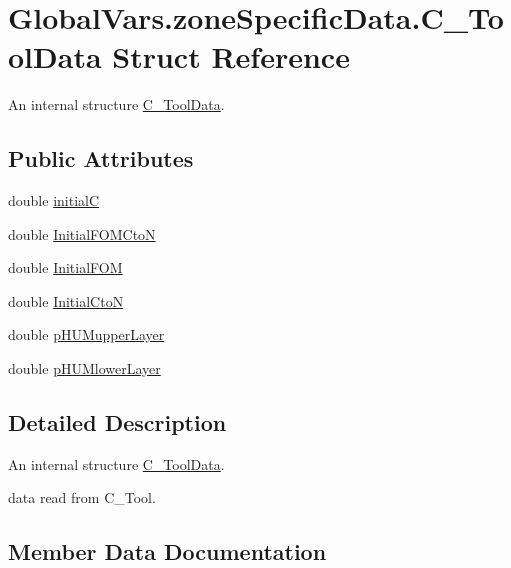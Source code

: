 \hypertarget{struct_global_vars_1_1zone_specific_data_1_1_c___tool_data}{}\section{Global\+Vars.\+zone\+Specific\+Data.\+C\+\_\+\+Tool\+Data Struct Reference}
\label{struct_global_vars_1_1zone_specific_data_1_1_c___tool_data}


An internal structure \mbox{\hyperlink{struct_global_vars_1_1zone_specific_data_1_1_c___tool_data}{C\+\_\+\+Tool\+Data}}.  


\subsection*{Public Attributes}
\begin{DoxyCompactItemize}
\item 
double \mbox{\hyperlink{struct_global_vars_1_1zone_specific_data_1_1_c___tool_data_a84e3d04eadc6033affa964091eb03ac1}{initialC}}
\item 
double \mbox{\hyperlink{struct_global_vars_1_1zone_specific_data_1_1_c___tool_data_ab34f87354c9761890d2f83b7c55297a9}{Initial\+F\+O\+M\+CtoN}}
\item 
double \mbox{\hyperlink{struct_global_vars_1_1zone_specific_data_1_1_c___tool_data_a414921dd1837684b350387e03bc5cac4}{Initial\+F\+OM}}
\item 
double \mbox{\hyperlink{struct_global_vars_1_1zone_specific_data_1_1_c___tool_data_a483776f1afdd2bd1858a877140164d12}{Initial\+CtoN}}
\item 
double \mbox{\hyperlink{struct_global_vars_1_1zone_specific_data_1_1_c___tool_data_a3a386d161b62ea999c64d6cc167d1c71}{p\+H\+U\+Mupper\+Layer}}
\item 
double \mbox{\hyperlink{struct_global_vars_1_1zone_specific_data_1_1_c___tool_data_a21f609c9041765da06076796a4457407}{p\+H\+U\+Mlower\+Layer}}
\end{DoxyCompactItemize}


\subsection{Detailed Description}
An internal structure \mbox{\hyperlink{struct_global_vars_1_1zone_specific_data_1_1_c___tool_data}{C\+\_\+\+Tool\+Data}}. 

data read from C\+\_\+\+Tool. 

\subsection{Member Data Documentation}
\mbox{\label{struct_global_vars_1_1zone_specific_data_1_1_c___tool_data_a84e3d04eadc6033affa964091eb03ac1}} 
